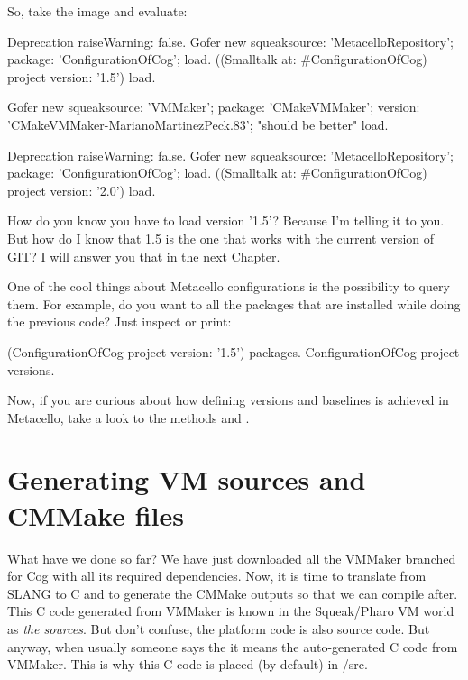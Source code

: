 \documentclass[a4paper,10pt,twoside]{book}
\begin{document}
So, take the image and evaluate:

\begin{code}{}
Deprecation raiseWarning: false.
Gofer new
	squeaksource: 'MetacelloRepository';
	package: 'ConfigurationOfCog';
	load.
((Smalltalk at: #ConfigurationOfCog) project version: '1.5') load.

Gofer new
	squeaksource: 'VMMaker';
	package: 'CMakeVMMaker';
	version: 'CMakeVMMaker-MarianoMartinezPeck.83';  "should be better"
	load.
\end{code}

\begin{code}{}
Deprecation raiseWarning: false.
Gofer new
	squeaksource: 'MetacelloRepository';
	package: 'ConfigurationOfCog';
	load.
((Smalltalk at: #ConfigurationOfCog) project version: '2.0') load.
\end{code}


How do you know you have to load version '1.5'? Because I'm telling it to you. But how do I know that 1.5 is the one that works with the current version of GIT?  I will answer you that in the next Chapter.

One of the cool things about  Metacello configurations is the possibility to query them. For example, do you want to all the packages that are installed while doing the previous code? Just inspect or print:

\begin{code}{}
(ConfigurationOfCog project version: '1.5') packages.
ConfigurationOfCog project versions.
\end{code}

Now, if you are curious about how defining versions and baselines is achieved in Metacello, take a look to the methods   and .


\section{Generating VM sources and CMMake files}

What have we done so far? We have just downloaded all the VMMaker branched for Cog with all its required dependencies. Now, it is time to translate from SLANG to C and to generate the CMMake outputs so that we can compile after. This C code generated from VMMaker is known in the Squeak/Pharo VM world as \emph{the sources}. But don't confuse, the platform code is also source code. But anyway, when usually someone says the  it means the auto-generated C code from VMMaker. This is why this C code is placed (by default) in /src.
\end{document}
